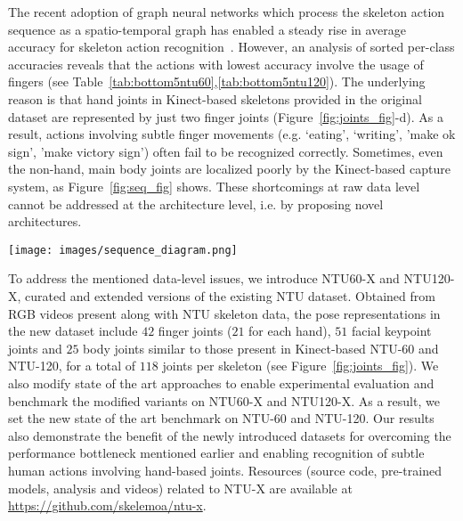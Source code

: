 \documentclass[sigconf,screen,prologue,table,dvipsnames]{acmart}
\begin{document}
The recent adoption of graph neural networks which process the skeleton action sequence as a  spatio-temporal graph has enabled a steady rise in average accuracy for skeleton action recognition~\cite{stgcn2018aaai,liu2020disentangling,cheng2020shiftgcn,song2020stronger,dstanet_accv2020}. However, an analysis of sorted per-class accuracies reveals that the actions with lowest accuracy involve the usage of fingers (see Table~\ref{tab:bottom5ntu60},\ref{tab:bottom5ntu120}). The underlying reason is that hand joints in Kinect-based skeletons provided in the original dataset are represented by just two finger joints (Figure~\ref{fig:joints_fig}-d). As a result, actions involving subtle finger movements (e.g. `eating', `writing', 'make ok sign', 'make victory sign') often fail to be recognized correctly. Sometimes, even the non-hand, main body joints are localized poorly by the Kinect-based capture system, as Figure~\ref{fig:seq_fig} shows. These shortcomings at raw data level cannot be addressed at the architecture level, i.e. by proposing novel architectures. 


\begin{figure*}[!t]
    \centering
    \texttt{[image: images/sequence\_diagram.png]}
    \caption{Sample skeletons from original NTU Kinect dataset (blue background) and proposed NTU-X dataset (pink background). Note that blurred RGB frame is included only for reference and is not part of skeleton data. The three classes mentioned - `eat meal', `writing' and `reading' are few of the most confused classes for NTU dataset (see Table~\ref{tab:bottom5ntu60}). As the zoomed insets illustrate, the quality of joints captured by NTU-X dataset is better compared to the original NTU dataset.}
    \label{fig:seq_fig}
\end{figure*}

To address the mentioned data-level issues, we introduce NTU60-X and NTU120-X, curated and extended versions of the existing NTU  dataset. Obtained from RGB videos present along with NTU skeleton data, the pose representations in the new dataset include $42$ finger joints ($21$ for each hand), $51$ facial keypoint joints and $25$ body joints similar to those present in Kinect-based NTU-60 and NTU-120, for a total of $118$ joints per skeleton (see Figure~\ref{fig:joints_fig}). We also modify state of the art approaches to enable experimental evaluation and benchmark the modified variants on NTU60-X and NTU120-X. As a result, we set the new state of the art benchmark on NTU-60 and NTU-120. Our results also demonstrate the benefit of the newly introduced datasets for overcoming the performance bottleneck mentioned earlier and enabling recognition of subtle human actions involving hand-based joints. 
Resources (source code, pre-trained models, analysis and videos) related to NTU-X are available at  \url{https://github.com/skelemoa/ntu-x}.
\end{document}
